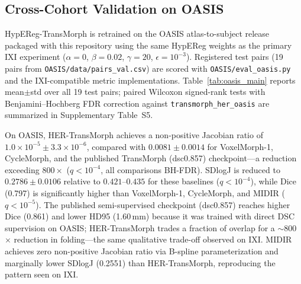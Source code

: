\documentclass[jimaging,article,submit,pdftex,moreauthors]{Definitions/mdpi}
\begin{document}
\subsection{Cross-Cohort Validation on OASIS}\label{sec:oasis_xcohort}
HypEReg-TransMorph is retrained on the OASIS atlas-to-subject release packaged with this repository using the same HypEReg weights as the primary IXI experiment ($\alpha{=}0$, $\beta{=}0.02$, $\gamma{=}20$, $\epsilon{=}10^{-3}$). Registered test pairs (19 pairs from \texttt{OASIS/data/pairs\_val.csv}) are scored with \texttt{OASIS/eval\_oasis.py} and the IXI-compatible metric implementations. Table~\ref{tab:oasis_main} reports mean$\pm$std over all 19 test pairs; paired Wilcoxon signed-rank tests with Benjamini--Hochberg FDR correction against \texttt{transmorph\_her\_oasis} are summarized in Supplementary Table~S5.

On OASIS, HER-TransMorph achieves a non-positive Jacobian ratio of $1.0\times10^{-5}\pm3.3\times10^{-6}$, compared with $0.0081\pm0.0014$ for VoxelMorph-1, CycleMorph, and the published TransMorph (dsc0.857) checkpoint---a reduction exceeding $800\times$ ($q<10^{-4}$, all comparisons BH-FDR). SDlogJ is reduced to $0.2786\pm0.0106$ relative to $0.421$--$0.435$ for these baselines ($q<10^{-4}$), while Dice (0.797) is significantly higher than VoxelMorph-1, CycleMorph, and MIDIR ($q<10^{-5}$). The published semi-supervised checkpoint (dsc0.857) reaches higher Dice (0.861) and lower HD95 (1.60\,mm) because it was trained with direct DSC supervision on OASIS; HER-TransMorph trades a fraction of overlap for a $\sim$800$\times$ reduction in folding---the same qualitative trade-off observed on IXI. MIDIR achieves zero non-positive Jacobian ratio via B-spline parameterization and marginally lower SDlogJ (0.2551) than HER-TransMorph, reproducing the pattern seen on IXI.
\end{document}
